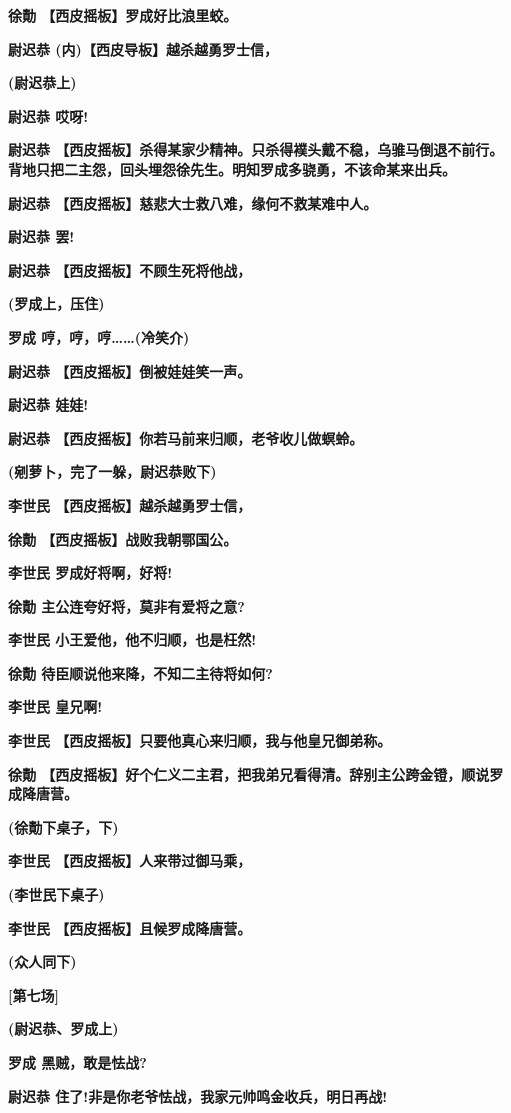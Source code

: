 \textbf{徐勣 【西皮摇板】罗成好比浪里蛟。}

\textbf{尉迟恭 (内)【西皮导板】越杀越勇罗士信，}

\textbf{(尉迟恭上)}

\textbf{尉迟恭 哎呀!}

\textbf{尉迟恭
【西皮摇板】杀得某家少精神。只杀得襆头戴不稳，乌骓马倒退不前行。背地只把二主怨，回头埋怨徐先生。明知罗成多骁勇，不该命某来出兵。}

\textbf{尉迟恭 【西皮摇板】慈悲大士救八难，缘何不救某难中人。}

\textbf{尉迟恭 罢!}

\textbf{尉迟恭 【西皮摇板】不顾生死将他战，}

\textbf{(罗成上，压住)}

\textbf{罗成 哼，哼，哼\ldots{}\ldots{}(冷笑介)}

\textbf{尉迟恭 【西皮摇板】倒被娃娃笑一声。}

\textbf{尉迟恭 娃娃!}

\textbf{尉迟恭 【西皮摇板】你若马前来归顺，老爷收儿做螟蛉。}

\textbf{(剜萝卜，完了一躲，尉迟恭败下)}

\textbf{李世民 【西皮摇板】越杀越勇罗士信，}

\textbf{徐勣 【西皮摇板】战败我朝鄂国公。}

\textbf{李世民 罗成好将啊，好将!}

\textbf{徐勣 主公连夸好将，莫非有爱将之意?}

\textbf{李世民 小王爱他，他不归顺，也是枉然!}

\textbf{徐勣 待臣顺说他来降，不知二主待将如何?}

\textbf{李世民 皇兄啊!}

\textbf{李世民 【西皮摇板】只要他真心来归顺，我与他皇兄御弟称。}

\textbf{徐勣
【西皮摇板】好个仁义二主君，把我弟兄看得清。辞别主公跨金镫，顺说罗成降唐营。}

\textbf{(徐勣下桌子，下)}

\textbf{李世民 【西皮摇板】人来带过御马乘，}

\textbf{(李世民下桌子)}

\textbf{李世民 【西皮摇板】且候罗成降唐营。}

\textbf{(众人同下)}

\textbf{{[}第七场{]}}

\textbf{(尉迟恭、罗成上)}

\textbf{罗成 黑贼，敢是怯战?}

\textbf{尉迟恭 住了!非是你老爷怯战，我家元帅鸣金收兵，明日再战!}

